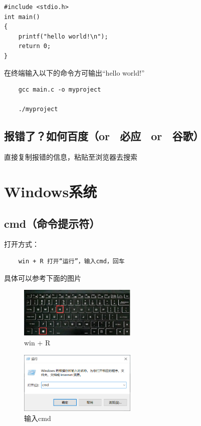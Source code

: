 \documentclass[12pt]{article}
\begin{document}
\begin{lstlisting}
#include <stdio.h>
int main()
{
    printf("hello world!\n");
    return 0;
}
\end{lstlisting}

在终端输入以下的命令方可输出“hello world!”
\begin{verbatim}
    gcc main.c -o myproject

    ./myproject
\end{verbatim}



\subsection{报错了？如何百度（or~ 必应 ~or~ 谷歌）}
直接复制报错的信息，粘贴至浏览器去搜索



\section{Windows系统}

\subsection{cmd（命令提示符）}
打开方式：
\begin{verbatim}
    win + R 打开“运行”，输入cmd，回车
\end{verbatim}

具体可以参考下面的图片
\begin{figure}[hbt!]
    \centering
    \includegraphics[width = 0.5\textwidth]{img/winjiar.png}
    \caption{win + R}
\end{figure}

\begin{figure}[hbt!]
    \centering
    \includegraphics[width = 0.5\textwidth]{img/cmd.png}
    \caption{输入cmd}
\end{figure}
\newpage
\end{document}
